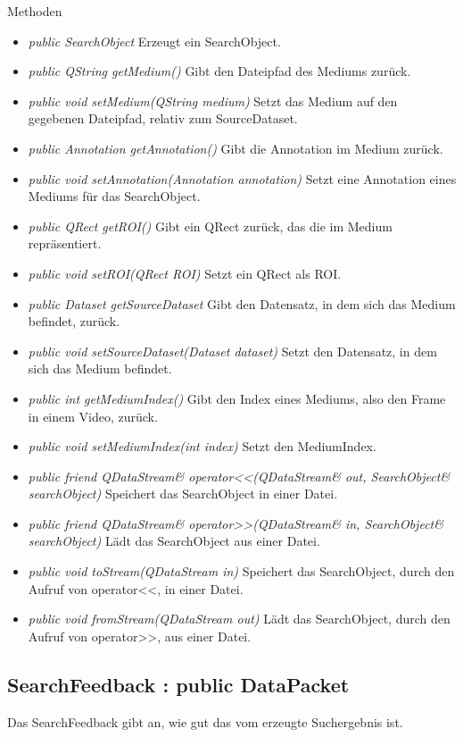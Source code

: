 Methoden
\begin{itemize}
\item \textit{public SearchObject} Erzeugt ein SearchObject.
\item \textit{public QString getMedium()} Gibt den Dateipfad des Mediums zurück.
\item \textit{public void setMedium(QString medium)} Setzt das Medium auf den gegebenen Dateipfad, relativ zum SourceDataset.
\item \textit{public Annotation getAnnotation()} Gibt die \gls{Annotation} im Medium zurück.
\item \textit{public void setAnnotation(Annotation annotation)} Setzt eine \gls{Annotation} eines Mediums für das SearchObject.
\item \textit{public QRect getROI()} Gibt ein QRect zurück, das die  im Medium repräsentiert.
\item \textit{public void setROI(QRect ROI)} Setzt ein QRect als \gls{ROI}.
\item \textit{public Dataset getSourceDataset} Gibt den Datensatz, in dem sich das Medium befindet, zurück.
\item \textit{public void setSourceDataset(Dataset dataset)} Setzt den Datensatz, in dem sich das Medium befindet.
\item \textit{public int getMediumIndex()} Gibt den Index eines Mediums, also den Frame in einem Video, zurück.
\item \textit{public void setMediumIndex(int index)} Setzt den MediumIndex.
\item \textit{public friend QDataStream\& operator<<(QDataStream\& out, SearchObject\& searchObject)} Speichert das SearchObject in einer Datei.
\item \textit{public friend QDataStream\& operator>>(QDataStream\& in, SearchObject\& searchObject)} Lädt das SearchObject aus einer Datei.
\item \textit{public void toStream(QDataStream in)} Speichert das SearchObject, durch den Aufruf von operator<<, in einer Datei.
\item \textit{public void fromStream(QDataStream out)} Lädt das SearchObject, durch den Aufruf von operator>>, aus einer Datei.
\end{itemize}

\subsection*{SearchFeedback : public DataPacket}
Das SearchFeedback gibt an, wie gut das vom  erzeugte Suchergebnis ist.

